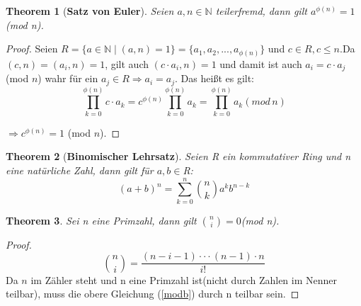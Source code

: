 \documentclass[12pt,oneside]{article}
\newtheorem{theorem}{Theorem}[section]
\theoremstyle{remark}
\theoremstyle{definition}
\begin{document}
\smallskip
\begin{theorem}[\textbf{Satz von Euler}]\label{Th_1}
Seien $a,n \in \mathbb{N}$ teilerfremd, \newline dann gilt $a^{\phi(n)} = 1 $(mod n).
\end{theorem}

\begin{proof}
    
Seien $R =\{ a \in \mathbb{N} \mid (a,n) = 1 \} =  \{a_{1}, a_{2},...,a_{\phi(n)} \}$ und $c \in R, c \leq n$.\newline\newline Da $(c,n) = (a_{i},n) = 1$, gilt auch $(c \cdot a_{i}, n) = 1$ \newline\newline und damit ist auch $a_{i} = c \cdot a_{j}$(mod $n$) wahr für ein $a_{j} \in R \Rightarrow a_{i} = a_{j}$. Das heißt es gilt:\newline
\begin{equation}
     \prod_{k = 0}^{\phi(n)} c \cdot a_{k} =
     c^{\phi(n)}\prod_{k = 0}^{\phi(n)} a_{k} = \prod_{k = 0}^{\phi(n)}  a_{k} (mod \, n )
\end{equation}
    
     $\Rightarrow c^{\phi(n)} = 1$ (mod $n$).

\end{proof}

\smallskip

\begin{theorem}[\textbf{Binomischer Lehrsatz}]\label{Th_3}
Seien R ein kommutativer Ring und n eine natürliche Zahl, dann gilt für $a,b \in $R:\newline\newline
 \begin{equation}
     (a + b)^n  = \sum_{k=0}^n {n \choose k} a^k b^{n-k}
 \end{equation}
\end{theorem}

\smallskip

\begin{theorem}\label{th_25}
Sei n eine Primzahl, dann gilt ${n \choose i} = 0 $(mod n).
\end{theorem}

\begin{proof}
\begin{equation}\label{modb}
    {n \choose i} = \frac{(n - i - 1) \cdot \cdot \cdot (n - 1) \cdot n }{i!}
\end{equation}
Da $n$ im Zähler steht und n eine Primzahl ist(nicht durch Zahlen im Nenner teilbar), muss die obere Gleichung (\ref{modb}) durch n teilbar sein. 
\end{proof}
\end{document}
